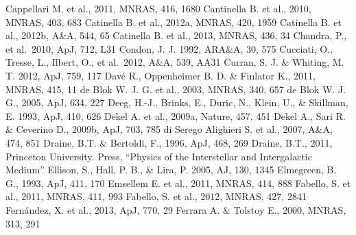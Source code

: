 \begin{thebibliography}{99}
\begin{multicols}{2}
{	Cappellari M. et al., 2011, MNRAS, 416, 1680
	Cantinella B. et al., 2010, MNRAS, 403, 683
	Catinella B. et al., 2012a, MNRAS, 420, 1959
	Catinella B. et al., 2012b, A\&A, 544, 65
	Catinella B. et al., 2013, MNRAS, 436, 34
   	 Chandra, P., et al.\ 2010, ApJ, 712, L31
 	Condon, J. J. 1992, ARA\&A, 30, 575
	Cucciati, O., Tresse, L., Ilbert, O., et al.\ 2012, A\&A, 539, AA31 
	Curran, S. J. \& Whiting, M. T. 2012, ApJ, 759, 117
	Dav\'{e} R., Oppenheimer B. D. \& Finlator K., 2011, MNRAS, 415, 11
	de Blok W. J. G. et al., 2003, MNRAS, 340, 657
	de Blok W. J. G., 2005, ApJ, 634, 227
    	Deeg, H.-J., Brinks, E., Duric, N., Klein, U., \& Skillman, E. 1993, ApJ, 410, 626
	Dekel A. et al., 2009a, Nature, 457, 451
	Dekel A., Sari R. \& Ceverino D., 2009b, ApJ, 703, 785
	di Serego Alighieri S. et al., 2007, A\&A, 474, 851
	Draine, B.T. \& Bertoldi, F., 1996, ApJ, 468, 269
	Draine, B.T., 2011, Princeton University. Press, ``Physics of the Interstellar and Intergalactic Medium''
    	Ellison, S.,  Hall, P. B., \& Lira, P. 2005, AJ, 130, 1345
	Elmegreen, B. G., 1993, ApJ, 411, 170
	Emsellem E. et al., 2011, MNRAS, 414, 888
	Fabello, S. et al., 2011, MNRAS, 411, 993
	Fabello, S. et al., 2012, MNRAS, 427, 2841
	Fern{\'a}ndez, X. et al., 2013, ApJ, 770, 29
	Ferrara A. \& Tolstoy E., 2000, MNRAS, 313, 291
}
\end{multicols}
\end{thebibliography}
